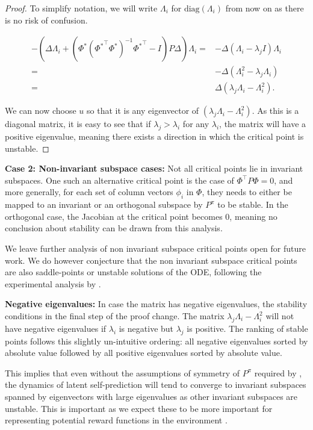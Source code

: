 \begin{proof}
To simplify notation, we will write $\Lambda_i$ for $\mathrm{diag}(\Lambda_i)$ from now on as there is no risk of confusion.

\begin{align*}
    -\left(\Delta \Lambda_i + \left(\Phi^*\left({\Phi^*}^\top \Phi^*\right)^{-1}{\Phi^*}^\top - I\right) P \Delta\right)\Lambda_i = &- \Delta \left(\Lambda_i - \lambda_j I\right) \Lambda_i\\
    = &-\Delta \left(\Lambda_i^2 - \lambda_j \Lambda_i\right) \\
    = &\Delta \left(\lambda_j \Lambda_i - \Lambda_i^2\right).
\end{align*}

We can now choose $u$ so that it is any eigenvector of $\left(\lambda_j \Lambda_i - \Lambda_i^2\right)$. As this is a diagonal matrix, it is easy to see that if $\lambda_j > \lambda_i$ for any $\lambda_i$, the matrix will have a positive eigenvalue, meaning there exists a direction in which the critical point is unstable.

\end{proof}
\textbf{Case 2: Non-invariant subspace cases:} Not all critical points lie in invariant subspaces.
One such an alternative critical point is the case of $\Phi^\top P \Phi = 0$, and more generally, for each set of column vectors $\phi_i$ in $\Phi$, they needs to either be mapped to an invariant or an orthogonal subspace by $P^\pi$ to be stable.
In the orthogonal case, the Jacobian at the critical point becomes 0, meaning no conclusion about stability can be drawn from this analysis.

We leave further analysis of non invariant subspace critical points open for future work.
We do however conjecture that the non invariant subspace critical points are also saddle-points or unstable solutions of the ODE, following the experimental analysis by \cite{tang2022understanding}.

\textbf{Negative eigenvalues:} In case the matrix has negative eigenvalues, the stability conditions in the final step of the proof change. The matrix $\lambda_j\Lambda_i - \Lambda_i^2$ will not have negative eigenvalues if $\lambda_i$ is negative but $\lambda_j$ is positive. The ranking of stable points follows this slightly un-intuitive ordering: all negative eigenvalues sorted by absolute value followed by all positive eigenvalues sorted by absolute value.



This implies that even without the assumptions of symmetry of $P^\pi$ required by \textcite{tang2022understanding}, the dynamics of latent self-prediction will tend to converge to invariant subspaces spanned by eigenvectors with large eigenvalues as other invariant subspaces are unstable.
This is important as we expect these to be more important for representing potential reward functions in the environment \parencite{lelan2023bootstrapped}. 

